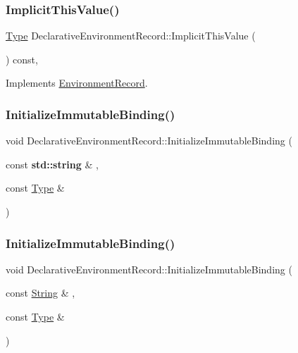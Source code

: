 \subsubsection{\texorpdfstring{Implicit\+This\+Value()}{ImplicitThisValue()}\hspace{0.1cm}{\footnotesize\ttfamily [2/2]}}
{\footnotesize\ttfamily \hyperlink{class_type}{Type} Declarative\+Environment\+Record\+::\+Implicit\+This\+Value (\begin{DoxyParamCaption}{ }\end{DoxyParamCaption}) const\hspace{0.3cm}{\ttfamily [final]}, {\ttfamily [virtual]}}



Implements \hyperlink{struct_environment_record_a9c60c0ab4900f6a8cdc50ceefdbf0507}{Environment\+Record}.

\mbox{\label{struct_declarative_environment_record_afe3114f214e519ce7562e43adb5b54ae}} 
\subsubsection{\texorpdfstring{Initialize\+Immutable\+Binding()}{InitializeImmutableBinding()}\hspace{0.1cm}{\footnotesize\ttfamily [1/2]}}
{\footnotesize\ttfamily void Declarative\+Environment\+Record\+::\+Initialize\+Immutable\+Binding (\begin{DoxyParamCaption}\item[{const \textbf{ std\+::string} \&}]{,  }\item[{const \hyperlink{class_type}{Type} \&}]{ }\end{DoxyParamCaption})}

\mbox{\label{struct_declarative_environment_record_ae2d908d84c12f6155dcb174a38bb7277}} 
\subsubsection{\texorpdfstring{Initialize\+Immutable\+Binding()}{InitializeImmutableBinding()}\hspace{0.1cm}{\footnotesize\ttfamily [2/2]}}
{\footnotesize\ttfamily void Declarative\+Environment\+Record\+::\+Initialize\+Immutable\+Binding (\begin{DoxyParamCaption}\item[{const \hyperlink{struct_string}{String} \&}]{,  }\item[{const \hyperlink{class_type}{Type} \&}]{ }\end{DoxyParamCaption})}


